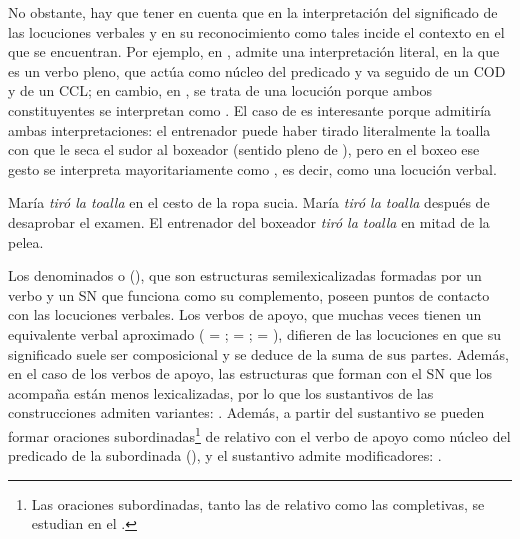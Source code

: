 No obstante, hay que tener en cuenta que en la interpretación del significado de
las locuciones verbales y en su reconocimiento como tales incide el contexto en
el que se encuentran. Por ejemplo, en ,  admite una interpretación literal, en la que  es un verbo
pleno, que actúa como núcleo del predicado y va seguido de un COD y de un CCL; en
cambio, en , se trata de una locución porque ambos
constituyentes se interpretan como . El caso de
 es interesante porque admitiría ambas interpretaciones: el
entrenador puede haber tirado literalmente la toalla con que le seca el sudor al
boxeador (sentido pleno de ), pero en el boxeo ese gesto se
interpreta mayoritariamente como , es decir, como una locución
verbal.

\begin{exe}
  \ex
    \begin{xlist}
      \ex\label{ex:11-toalla-a} María \textit{tiró la toalla} en el cesto de la
          ropa sucia.
      \ex\label{ex:11-toalla-b} María \textit{tiró la toalla} después de
          desaprobar el examen.
      \ex\label{ex:11-toalla-c} El entrenador del boxeador \textit{tiró la toalla}
          en mitad de la pelea.
    \end{xlist}
\end{exe}

\begin{recuadro}
Los denominados  o  (), que son estructuras semilexicalizadas
formadas por un verbo y un SN que funciona como su complemento, poseen puntos de
contacto con las locuciones verbales. Los verbos de apoyo, que muchas veces
tienen un equivalente verbal aproximado ( = ;
 = ;  =
), difieren de las locuciones en que su significado suele ser
composicional y se deduce de la suma de sus partes. Además, en el caso de los
verbos de apoyo, las estructuras que forman con el SN que los acompaña están
menos lexicalizadas, por lo que los sustantivos de las construcciones admiten
variantes: . Además, a partir
del sustantivo se pueden formar oraciones subordinadas\footnote{Las oraciones
subordinadas, tanto las de relativo como las completivas, se estudian en el
.} de relativo con el verbo de apoyo como núcleo del predicado de la
subordinada (), y el sustantivo
admite modificadores: .
\end{recuadro}

